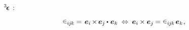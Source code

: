 ~\textcolor{magenta}{}~${^3\hspace{-0.25ex}\bm{\epsilon}}\hspace{.05ex}$
\::

\nopagebreak\vspace{-0.3em}\begin{equation*}
\permutationsparitysymbols{i\hspace{-0.1ex}j\hspace{-0.1ex}k} \hspace{-0.15ex} = \hspace{.15ex}
\hspace{.1ex} \bm{e}_i \hspace{-0.2ex} \times \hspace{-0.2ex} \bm{e}_j \hspace{-0.1ex} \dotp \hspace{.12ex} \bm{e}_k
\:\Leftrightarrow\:
\bm{e}_i \hspace{-0.1ex} \times \bm{e}_j \hspace{-0.12ex}
= \permutationsparitysymbols{i\hspace{-0.1ex}j\hspace{-0.1ex}k} \hspace{.2ex} \bm{e}_k
\hspace{.1ex} ,
\end{equation*}\vspace{-1.6em}
